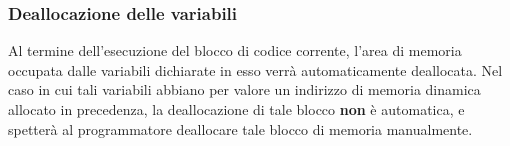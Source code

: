 \subsubsection{Deallocazione delle variabili}
Al termine dell'esecuzione del blocco di codice corrente, l'area di memoria occupata dalle variabili dichiarate in esso verrà automaticamente
deallocata. Nel caso in cui tali variabili abbiano per valore un indirizzo di memoria dinamica allocato in precedenza, la deallocazione di tale blocco 
\textbf{non} è automatica, e spetterà al programmatore deallocare tale blocco di memoria manualmente.

\vspace{0.5cm}